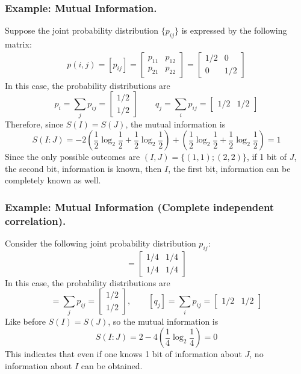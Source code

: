 \documentclass[../../../main.tex]{subfiles}
\begin{document}
\subsubsection{Example: Mutual Information.}
Suppose the joint probability distribution $\{p_{ij}\}$ is expressed by the following matrix:
\begin{align*}
  p(i,j) = [p_{ij}] =
\begin{bmatrix}
p_{11} & p_{12} \\
p_{21} & p_{22}
\end{bmatrix}
=
\begin{bmatrix}
1/2 & 0 \\
0 & 1/2
\end{bmatrix}
\end{align*}
In this case, the probability distributions are
\begin{equation*}
  p_i = \sum_j p_{ij} =
\begin{bmatrix}
1/2 \\
1/2
\end{bmatrix}\qquad
q_j = \sum_i p_{ij} =
\begin{bmatrix}
1/2 & 1/2
\end{bmatrix}
\end{equation*}
Therefore, since $S(I) = S(J) $, the mutual information is
\begin{equation*}
  S(I : J) = 
  -2\left(\frac{1}{2}\log_2\frac{1}{2}+\frac{1}{2}\log_2\frac{1}{2}\right)
  +\left(\frac{1}{2}\log_2\frac{1}{2}+\frac{1}{2}\log_2\frac{1}{2}\right)
  =1
\end{equation*}
Since the only possible outcomes are $(I,J)=\{(1,1);(2,2)\}$, if 1 bit of $J$, the second bit, information is known, then $I$, the first bit, information can be completely known as well.

\subsubsection{Example: Mutual Information (Complete independent correlation).}
Consider the following joint probability distribution \( p_{ij} \):
\begin{equation*}
  [p_{ij}] =
\begin{bmatrix}
1/4 & 1/4 \\
1/4 & 1/4
\end{bmatrix}
\end{equation*}
In this case, the probability distributions are
\begin{equation*}
  [p_i] = \sum_j p_{ij} =
\begin{bmatrix}
1/2 \\
1/2
\end{bmatrix}, \qquad
[q_j] = \sum_i p_{ij} =
\begin{bmatrix}
1/2 & 1/2
\end{bmatrix}
\end{equation*}
Like before \( S(I) = S(J)  \), so the mutual information is
\begin{equation*}
  S(I : J) =2 -4\left(\frac{1}{4}\log_2\frac{1}{4}\right)= 0
\end{equation*}
This indicates that even if one knows 1 bit of information about \( J \), no information about \( I \) can be obtained.
\end{document}
